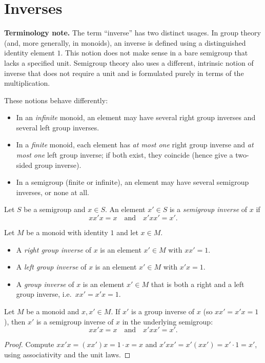 
\section{Inverses}

\noindent\textbf{Terminology note.}
The term “inverse” has two distinct usages. In group theory (and, more generally, in monoids), an inverse is defined using a distinguished identity element \(1\). This notion does not make sense in a bare semigroup that lacks a specified unit. Semigroup theory also uses a different, intrinsic notion of inverse that does not require a unit and is formulated purely in terms of the multiplication.

These notions behave differently:
\begin{itemize}
  \item In an \emph{infinite} monoid, an element may have several right group inverses and several left group inverses.
  \item In a \emph{finite} monoid, each element has \emph{at most one} right group inverse and \emph{at most one} left group inverse; if both exist, they coincide (hence give a two-sided group inverse).
  \item In a semigroup (finite or infinite), an element may have several semigroup inverses, or none at all.
\end{itemize}

\begin{definition}
\label{def:semigroup-inverse}
Let \(S\) be a semigroup and \(x\in S\). An element \(x'\in S\) is a \emph{semigroup inverse} of \(x\) if
\[
x x' x = x \quad\text{and}\quad x' x x' = x'.
\]
\end{definition}

\begin{definition}
\label{def:group-inverse}
Let \(M\) be a monoid with identity \(1\) and let \(x\in M\).
\begin{itemize}
  \item A \emph{right group inverse} of \(x\) is an element \(x'\in M\) with \(x x' = 1\).
  \item A \emph{left group inverse} of \(x\) is an element \(x'\in M\) with \(x' x = 1\).
  \item A \emph{group inverse} of \(x\) is an element \(x'\in M\) that is both a right and a left group inverse, i.e.\ \(x x' = x' x = 1\).
\end{itemize}
\end{definition}

\begin{lemma}
\label{lem:group-inverse-implies-semigroup-inverse}
Let \(M\) be a monoid and \(x,x'\in M\). If \(x'\) is a group inverse of \(x\) (so \(x x' = x' x = 1\)), then \(x'\) is a semigroup inverse of \(x\) in the underlying semigroup:
\[
x x' x = x \quad\text{and}\quad x' x x' = x'.
\]
\end{lemma}
\begin{proof}
Compute \(x x' x = (x x') x = 1\cdot x = x\) and \(x' x x' = x' (x x') = x' \cdot 1 = x'\), using associativity and the unit laws.
\end{proof}